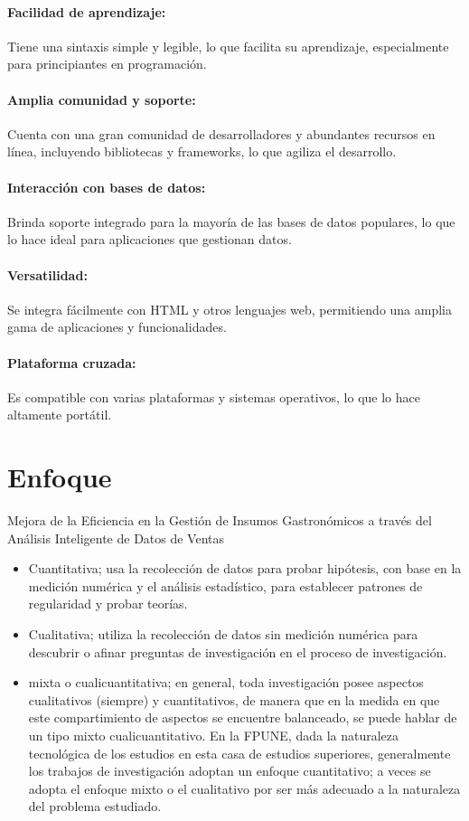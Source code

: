 \paragraph{Facilidad de aprendizaje:}
Tiene una sintaxis simple y legible, lo que facilita su aprendizaje, especialmente para principiantes en programación.
\paragraph{Amplia comunidad y soporte:}
Cuenta con una gran comunidad de desarrolladores y abundantes recursos en línea, incluyendo bibliotecas y frameworks, lo que agiliza el desarrollo.
\paragraph{Interacción con bases de datos:}
Brinda soporte integrado para la mayoría de las bases de datos populares, lo que lo hace ideal para aplicaciones que gestionan datos.
\paragraph{Versatilidad:}
Se integra fácilmente con HTML y otros lenguajes web, permitiendo una amplia gama de aplicaciones y funcionalidades.
\paragraph{Plataforma cruzada:}
Es compatible con varias plataformas y sistemas operativos, lo que lo hace altamente portátil.

\section{Enfoque}
Mejora de la Eficiencia en la Gestión de Insumos Gastronómicos a través del Análisis Inteligente de Datos de Ventas
\begin{itemize}
\item Cuantitativa; usa la recolección de datos para probar hipótesis, con base en la medición numérica y el análisis estadístico, para establecer patrones de regularidad y probar teorías. 
\item Cualitativa; utiliza la recolección de datos sin medición numérica para descubrir o afinar preguntas de investigación en el proceso de investigación.
\item mixta o cualicuantitativa; en general, toda investigación posee aspectos cualitativos (siempre) y cuantitativos, de manera que en la medida en que este compartimiento de aspectos se encuentre balanceado, se puede hablar de un tipo mixto cualicuantitativo.
En la FPUNE, dada la naturaleza tecnológica de los estudios en esta casa de estudios superiores, generalmente los trabajos de investigación adoptan un enfoque cuantitativo; a veces se adopta el enfoque mixto o el cualitativo por ser más adecuado a la naturaleza del problema estudiado.
\end{itemize}

